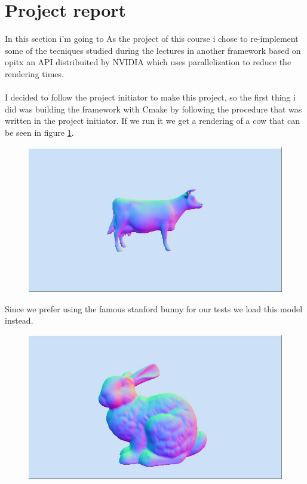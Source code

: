 \section{Project report}
In this section i'm going to 
As the project of this course i chose to re-implement some of the tecniques studied during the lectures in another framework based on opitx an API distribuited by NVIDIA which uses parallelization to reduce the rendering times.\\\\
I decided to follow the project initiator to make this project, so the first thing i did was building the framework with Cmake by following the procedure that was written in the project initiator. 
If we run it we get a rendering of a cow that can be seen in figure \ref{fig:cow}.
\begin{figure}[H]
	\centering
	\includegraphics[scale=\imagescale]{images/project/1}
	\caption{}
	\label{fig:cow}
\end{figure}
Since we prefer using the famous stanford bunny for our tests we load this model instead.
\begin{figure}[H]
	\centering
	\includegraphics[scale=\imagescale]{images/project/2}
	\caption{}
	\label{fig:bunny}
\end{figure}
